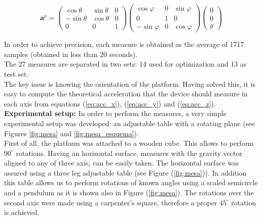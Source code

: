 \documentclass[conference]{IEEEtran}
\newcommand{\refp}[1]{(\ref{#1})}
\begin{document}
\begin{scriptsize}
\begin{equation}
\mathbf{a}^p = \left(\begin{array}{ccc}
\cos \theta & \sin \theta & 0\\
-\sin \theta & \cos \theta & 0\\
0 & 0 & 1
\end{array}\right)\left(\begin{array}{ccc}
\cos \varphi & 0 &\sin \varphi\\
0 & 1 & 0\\
-\sin \varphi & 0 & \cos \varphi
\end{array}\right)\left(\begin{array}{c}
0\\
0\\
g
\end{array}\right)
\label{eq:acc_z}
\end{equation}
\end{scriptsize}
In order to achieve precision, each measure is obtained as the average of 1717 samples (obtained in less than 20 seconds).\\

The 27 measures are separated in two sets: 14 used for optimization and 13 as test set.\\

The key issue is knowing the orientation of the platform. Having solved this, it is easy to compute the theoretical acceleration that the device should measure in each axis from equations \refp{eq:acc_x}, \refp{eq:acc_y} and \refp{eq:acc_z}.\\

\textbf{Experimental setup:} In order to perform the measures, a very simple experimental setup was developed: an adjustable table with a rotating plane (see Figures \ref{fig:mesa} and \ref{fig:mesa_esquema}).\\

First of all, the platform was attached to a wooden cube. This allows to perform $90^\circ$ rotations. Having an horizontal surface, measures with the gravity vector aligned to any of three axis, can be easily taken. The horizontal surface was assured using a three leg adjustable table (see Figure \refp{fig:mesa}). In addition this table allows us to perform rotations of known angles using a scaled semicircle and a pendulum as it is shown also in Figure \refp{fig:mesa}. The rotations over the second axis were made using a carpenter's square, therefore a proper $45^\circ$ rotation is achieved.\\
\end{document}
